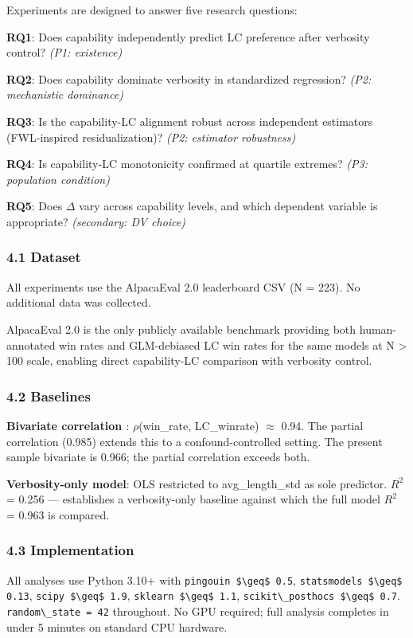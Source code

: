 
Experiments are designed to answer five research questions:

\textbf{RQ1}: Does capability independently predict LC preference after verbosity control? \textit{(P1: existence)}

\textbf{RQ2}: Does capability dominate verbosity in standardized regression? \textit{(P2: mechanistic dominance)}

\textbf{RQ3}: Is the capability-LC alignment robust across independent estimators (FWL-inspired residualization)? \textit{(P2: estimator robustness)}

\textbf{RQ4}: Is capability-LC monotonicity confirmed at quartile extremes? \textit{(P3: population condition)}

\textbf{RQ5}: Does $\Delta$ vary across capability levels, and which dependent variable is appropriate? \textit{(secondary: DV choice)}

\subsubsection{4.1 Dataset}

All experiments use the AlpacaEval 2.0 leaderboard CSV (N = 223). No additional data was collected.

AlpacaEval 2.0 is the only publicly available benchmark providing both human-annotated win rates and GLM-debiased LC win rates for the same models at N > 100 scale, enabling direct capability-LC comparison with verbosity control.

\subsubsection{4.2 Baselines}

\textbf{Bivariate correlation \citep{Dubois2024LengthControlled}}: $\rho$(win\_rate, LC\_winrate) $\approx$ 0.94. The partial correlation (0.985) extends this to a confound-controlled setting. The present sample bivariate is 0.966; the partial correlation exceeds both.

\textbf{Verbosity-only model}: OLS restricted to avg\_length\_std as sole predictor. $R^2$ = 0.256 --- establishes a verbosity-only baseline against which the full model $R^2$ = 0.963 is compared.

\subsubsection{4.3 Implementation}

All analyses use Python 3.10+ with \texttt{pingouin \$\textbackslash geq\$ 0.5}, \texttt{statsmodels \$\textbackslash geq\$ 0.13}, \texttt{scipy \$\textbackslash geq\$ 1.9}, \texttt{sklearn \$\textbackslash geq\$ 1.1}, \texttt{scikit\textbackslash \_posthocs \$\textbackslash geq\$ 0.7}. \texttt{random\textbackslash \_state = 42} throughout. No GPU required; full analysis completes in under 5 minutes on standard CPU hardware.

